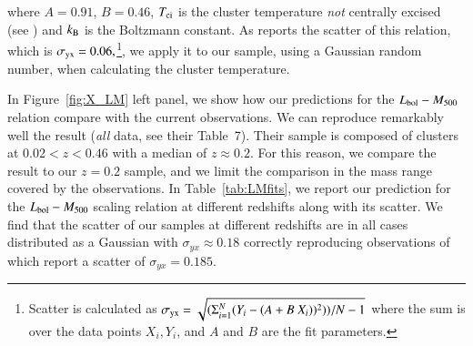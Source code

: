 \documentclass[traditabstract]{aa}
\begin{document}
where $A=0.91$, $B=0.46$, $T_{\rm{ci}}$ is the cluster temperature \emph{not} centrally excised (see \citealp{2010MNRAS.406.1773M}) and $k_{\rm{B}}$ is the Boltzmann constant. As \cite{2010MNRAS.406.1773M} reports the scatter of this relation, which is $\sigma_{\rm{yx}} = 0.06,$\footnote[7]{Scatter is calculated as $\sigma_{\rm{yx}} = \sqrt{ ( \Sigma_{i=1}^{N} (Y_{i}-(A+B~X_{i}))^{2}) ) / N-1}$ where the sum is over the data points $X_{i}, Y_{i}$, and $A$ and $B$ are the fit parameters.}, we apply it to our sample, using a Gaussian random number, when calculating the cluster temperature. 

In Figure~\ref{fig:X_LM} left panel, we show how our predictions for the $L_{\rm{bol}}-M_{500}$ relation compare with the current observations. We can reproduce remarkably well the \cite{2010MNRAS.406.1773M} result (\emph{all} data, see their Table~7). Their sample is composed of clusters at $0.02<z<0.46$ with a median of $z \approx 0.2$. For this reason, we compare the \cite{2010MNRAS.406.1773M} result to our $z=0.2$ sample, and we limit the comparison in the mass range covered by the observations.
In Table~\ref{tab:LMfits}, we report our prediction for the $L_{\rm{bol}}-M_{500}$ scaling relation at different redshifts along with its scatter. We find that the scatter of our samples at different redshifts are in all cases distributed as a Gaussian with $\sigma_{yx} \approx 0.18$ correctly reproducing observations of \cite{2010MNRAS.406.1773M} which report a scatter of $\sigma_{yx} = 0.185$.
\end{document}
